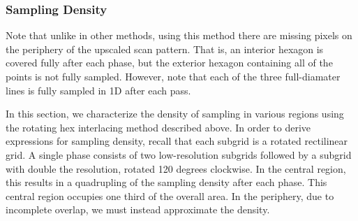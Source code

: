 \documentclass[aip, amsmath, amssymb, nobibnotes, nofootinbib, citeautoscript, reprint, superscriptaddress]{revtex4-1}
\begin{document}



    \subsubsection{\label{sec:density}Sampling Density}

    Note that unlike in other methods, using this method there are missing pixels on the periphery of the upscaled scan pattern.
    That is, an interior hexagon is covered fully after each phase, but the exterior hexagon containing all of the points is not fully sampled.
    However, note that each of the three full-diamater lines is fully sampled in 1D after each pass.


    In this section, we characterize the density of sampling in various regions using the rotating hex interlacing method described above.
    In order to derive expressions for sampling density, recall that each subgrid is a rotated rectilinear grid.
    A single phase consists of two low-resolution subgrids followed by a subgrid with double the resolution, rotated 120 degrees clockwise.
    In the central region, this results in a quadrupling of the sampling density after each phase.
    This central region occupies one third of the overall area.
    In the periphery, due to incomplete overlap, we must instead approximate the density.
\end{document}
